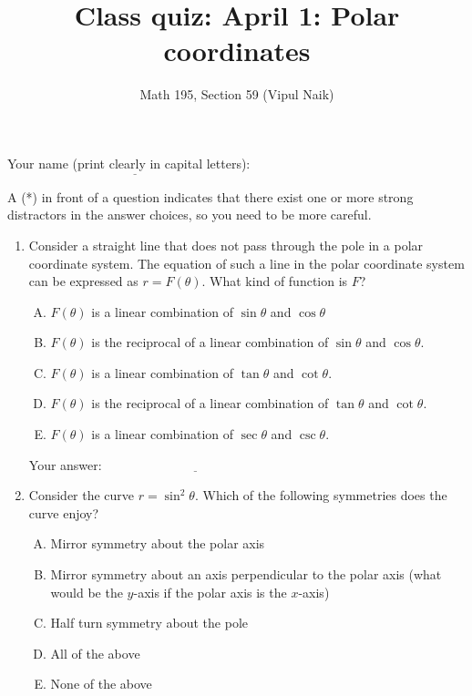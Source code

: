 \documentclass[10pt]{amsart}
\title{Class quiz: April 1: Polar coordinates}
\author{Math 195, Section 59 (Vipul Naik)}
\begin{document}
\maketitle

Your name (print clearly in capital letters): $\underline{\qquad\qquad\qquad\qquad\qquad\qquad\qquad\qquad\qquad\qquad}$

A (*) in front of a question indicates that there exist one or more
strong distractors in the answer choices, so you need to be more careful.
\begin{enumerate}

\item Consider a straight line that does not pass through the pole in
  a polar coordinate system. The equation of such a line in the polar
  coordinate system can be expressed as $r = F(\theta)$. What kind of
  function is $F$?

  \begin{enumerate}[(A)]

  \item $F(\theta)$ is a linear combination of $\sin \theta$ and $\cos \theta$
  \item $F(\theta)$ is the reciprocal of a linear combination of $\sin
    \theta$ and $\cos \theta$.
  \item $F(\theta)$ is a linear combination of $\tan \theta$ and $\cot
    \theta$.
  \item $F(\theta)$ is the reciprocal of a linear combination of $\tan
    \theta$ and $\cot \theta$.
  \item $F(\theta)$ is a linear combination of $\sec \theta$ and $\csc
    \theta$.
  \end{enumerate}

  \vspace{0.1in}
  Your answer: $\underline{\qquad\qquad\qquad\qquad\qquad\qquad\qquad}$
  \vspace{0.6in}

\item Consider the curve $r = \sin^2\theta$. Which of the following
  symmetries does the curve enjoy?

  \begin{enumerate}[(A)]
  \item Mirror symmetry about the polar axis
  \item Mirror symmetry about an axis perpendicular to the polar axis
    (what would be the $y$-axis if the polar axis is the $x$-axis)
  \item Half turn symmetry about the pole
  \item All of the above
  \item None of the above
  \end{enumerate}


\end{enumerate}
\end{document}

